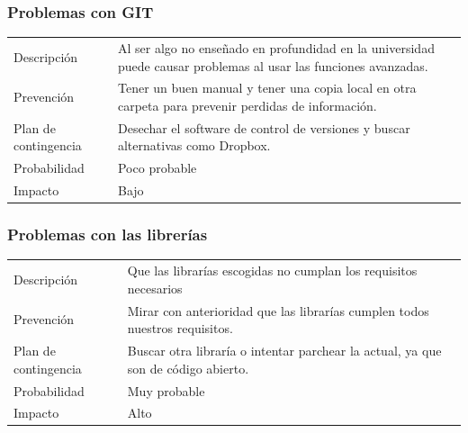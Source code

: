 \subsubsection{Problemas con GIT}
\begin{table}[H]
    \begin{center}
        \begin{tabular}{l p{8cm}}
            Descripci\'{o}n                 & Al ser algo no ense\~{n}ado en profundidad en la universidad puede causar problemas al 
            								  usar las funciones avanzadas. \\
            Prevenci\'{o}n                  & Tener un buen manual y tener una copia local en otra carpeta para prevenir perdidas de 
            								  informaci\'{o}n. \\ 
            Plan de contingencia            & Desechar el software de control de versiones y buscar alternativas como Dropbox. \\
            Probabilidad                    & Poco probable \\
            Impacto                         & Bajo \\
        \end{tabular}
    \end{center}  
\end{table}
\subsubsection{Problemas con las librer\'{i}as}
\begin{table}[H]
    \begin{center}
        \begin{tabular}{l p{8cm}}
            Descripci\'{o}n                 & Que las librar\'{i}as escogidas no cumplan los requisitos necesarios \\
            Prevenci\'{o}n                  & Mirar con anterioridad que las librar\'{i}as cumplen todos nuestros requisitos. \\ 
            Plan de contingencia            & Buscar otra librar\'{i}a o intentar parchear la actual, ya que son de c\'{o}digo 
            								  abierto. \\
            Probabilidad                    & Muy probable \\
            Impacto                         & Alto \\
        \end{tabular}
    \end{center}
    
\end{table}
